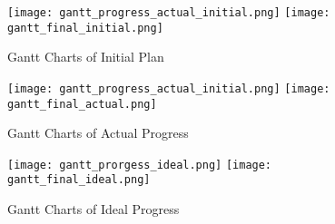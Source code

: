\begin{figure}[h]
    \centering
    \texttt{[image: gantt\_progress\_actual\_initial.png]}
    \texttt{[image: gantt\_final\_initial.png]}
    \caption{Gantt Charts of Initial Plan}
\end{figure}

\begin{figure}[h]
    \centering
    \texttt{[image: gantt\_progress\_actual\_initial.png]}
    \texttt{[image: gantt\_final\_actual.png]}
    \caption{Gantt Charts of Actual Progress}
\end{figure}

\begin{figure}[h]
    \centering
    \texttt{[image: gantt\_prorgess\_ideal.png]}
    \texttt{[image: gantt\_final\_ideal.png]}
    \caption{Gantt Charts of Ideal Progress}
\end{figure}